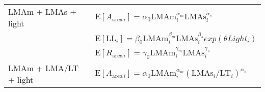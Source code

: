 \documentclass[
  12pt,
]{article}
\providecommand{\DIFaddbegin}{} %
\providecommand{\DIFaddend}{} %
\providecommand{\DIFdelbegin}{} %
\providecommand{\DIFdelend}{} %
\newcommand{\DIFscaledelfig}{0.5}
\newlength{\DIFdelgraphicswidth} %
\newlength{\DIFdelgraphicsheight} %
\newcommand{\DIFaddincludegraphics}[2][]{{\color{blue}\fbox{\DIFOincludegraphics[#1]{#2}}}} %
\newcommand{\DIFdelincludegraphics}[2][]{%
\sbox{\DIFdelgraphicsbox}{\DIFOincludegraphics[#1]{#2}}%
\settoboxwidth{\DIFdelgraphicswidth}{\DIFdelgraphicsbox} %
\settoboxtotalheight{\DIFdelgraphicsheight}{\DIFdelgraphicsbox} %
\scalebox{\DIFscaledelfig}{%
\parbox[b]{\DIFdelgraphicswidth}{\usebox{\DIFdelgraphicsbox}\\[-\baselineskip] \rule{\DIFdelgraphicswidth}{0em}}\llap{\resizebox{\DIFdelgraphicswidth}{\DIFdelgraphicsheight}{%
\setlength{\unitlength}{\DIFdelgraphicswidth}%
\begin{picture}(1,1)%
\thicklines\linethickness{2pt} %
{\color[rgb]{1,0,0}\put(0,0){\framebox(1,1){}}}%
{\color[rgb]{1,0,0}\put(0,0){\line( 1,1){1}}}%
{\color[rgb]{1,0,0}\put(0,1){\line(1,-1){1}}}%
\end{picture}%
}\hspace*{3pt}}} %
} %
\DeclareRobustCommand{\DIFaddbegin}{\DIFOaddbegin \let\includegraphics\DIFaddincludegraphics} %
\DeclareRobustCommand{\DIFaddend}{\DIFOaddend \let\includegraphics\DIFOincludegraphics} %
\DeclareRobustCommand{\DIFdelbegin}{\DIFOdelbegin \let\includegraphics\DIFdelincludegraphics} %
\DeclareRobustCommand{\DIFdelend}{\DIFOaddend \let\includegraphics\DIFOincludegraphics} %
\begin{document}
\begin{longtable}[]{@{}
  >{\raggedright\arraybackslash}p{}
  >{\raggedright\arraybackslash}p{}@{}}
\DIFdelend \DIFaddbegin \\
\DIFaddend LMAm + LMAs + light \DIFdelbegin %
\DIFdelend & \DIFdelbegin %
\DIFdelend \(\mathrm{E}[A_{\mathrm{area} \, i}]= \alpha_0\mathrm{LMAm}_{i}^{\alpha_m} \mathrm{LMAs}_{i}^{\alpha_s}\) \DIFdelbegin %
\DIFdelend \DIFaddbegin \\
\DIFaddend & \DIFdelbegin %
\DIFdelend \(\mathrm{E}[\mathrm{LL}_i] = \beta_0\mathrm{LMAm}_{i}^{\beta_m} \mathrm{LMAs}_{i}^{\beta_s}exp(\theta Light_i)\) \DIFdelbegin %
\DIFdelend \DIFaddbegin \\
\DIFaddend & \DIFdelbegin %
\DIFdelend \(\mathrm{E}[R_{\mathrm{area} \, i}] = \gamma_0\mathrm{LMAm}_{i}^{\gamma_m} \mathrm{LMAs}_{i}^{\gamma_s}\) \DIFdelbegin %
\DIFdelend \DIFaddbegin \\
\DIFaddend LMAm + LMA/LT + light \DIFdelbegin %
\DIFdelend & \DIFdelbegin %
\DIFdelend \(\mathrm{E}[A_{\mathrm{area} \, i}]= \alpha_0\mathrm{LMAm}_{i}^{\alpha_m} (\mathrm{LMAs}_{i}/\mathrm{LT}_{i})^{\alpha_s}\) \DIFdelbegin %

\end{longtable}
\end{document}
